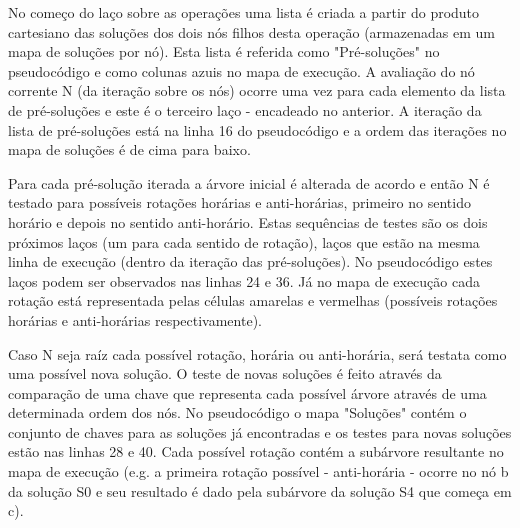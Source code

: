 No começo do laço sobre as operações uma lista é criada a partir do produto cartesiano das soluções dos dois nós filhos desta operação (armazenadas em um mapa de soluções por nó). Esta lista é referida como "Pré-soluções" no pseudocódigo e como colunas azuis no mapa de execução. A avaliação do nó corrente N (da iteração sobre os nós) ocorre uma vez para cada elemento da lista de pré-soluções e este é o terceiro laço - encadeado no anterior. A iteração da lista de pré-soluções está na linha 16 do pseudocódigo e a ordem das iterações no mapa de soluções é de cima para baixo.

Para cada pré-solução iterada a árvore inicial é alterada de acordo e então N é testado para possíveis rotações horárias e anti-horárias, primeiro no sentido horário e depois no sentido anti-horário. Estas sequências de testes são os dois próximos laços (um para cada sentido de rotação), laços que estão na mesma linha de execução (dentro da iteração das pré-soluções). No pseudocódigo estes laços podem ser observados nas linhas 24 e 36. Já no mapa de execução cada rotação está representada pelas células amarelas e vermelhas (possíveis rotações horárias e anti-horárias respectivamente).

Caso N seja raíz cada possível rotação, horária ou anti-horária, será testata como uma possível nova solução. O teste de novas soluções é feito através da comparação de uma chave que representa cada possível árvore através de uma determinada ordem dos nós. No pseudocódigo o mapa "Soluções" contém o conjunto de chaves para as soluções já encontradas e os testes para novas soluções estão nas linhas 28 e 40. Cada possível rotação contém a subárvore resultante no mapa de execução (e.g. a primeira rotação possível - anti-horária - ocorre no nó b da solução S0 e seu resultado é dado pela subárvore da solução S4 que começa em c).

	
	
